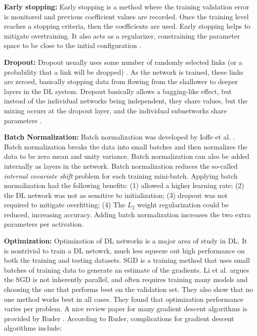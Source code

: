 \documentclass[12pt]{spieman}
\begin{document}
\begin{spacing}{1}
\textbf{Early stopping:} Early stopping is a method where the training validation error is monitored and previous coefficient values are recorded. Once the training level reaches a stopping criteria, then the coefficients are used. Early stopping helps to mitigate overtraining. It also acts as a regularizer, constraining the parameter space to be close to the initial configuration \cite{Erhan2010} .
        
\textbf{Dropout:} Dropout usually uses some number of randomly selected links (or a probability that a link will be dropped) \cite{Srivastava2014Dropout} . As the network is trained, these links are zeroed, basically stopping data from flowing from the shallower to deeper layers in the DL system. Dropout basically allows a bagging-like effect, but instead of the individual networks being independent, they share values, but the mixing occurs at the dropout layer, and the individual subnetworks share parameters \cite{goodfellow2016deep} .
    
\textbf{Batch Normalization:} Batch normalization was developed by Ioffe et al. \cite{ioffe2015batch}. Batch normalization breaks the data into small batches and then normalizes the data to be zero mean and unity variance. Batch normalization can also be added internally as layers in the network. Batch normalization reduces the so-called \textit{internal covariate shift} problem for each training mini-batch. Applying batch normalization had the following benefits: (1) allowed a higher learning rate; (2) the DL network was not as sensitive to initialization; (3) dropout was not required to mitigate overfitting; (4) The $L_{2}$ weight regularization could be reduced, increasing accuracy. Adding batch normalization increases the two extra parameters per activation. 
           
\textbf{Optimization:} Optimization of DL networks is a major area of study in DL. It is nontrivial to train a DL netowrk, much less squeeze out high performance on both the training and testing datasets. SGD is a training method that uses small batches of training data to generate an estimate of the gradients. Li et al. \cite{Le2011Optimization} argues the SGD is not inherently parallel, and often requires training many models and choosing the one that performs best on the validation set. They also show that no one method works best in all cases. They found that optimization performance varies per problem. A nice review paper for many gradient descent algorithms is provided by Ruder \cite{ruder2016overview} . According to Ruder, complications for gradient descent algorithms include: 


\end{spacing}
\end{document}
